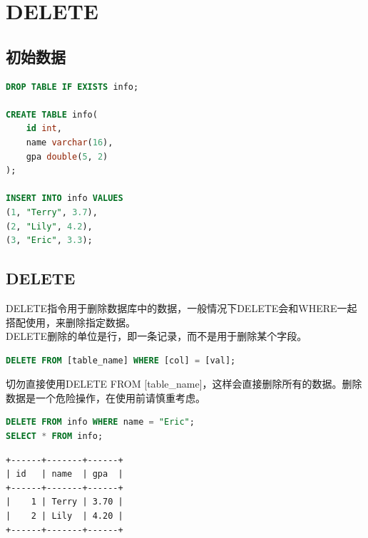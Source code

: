 \documentclass[12pt, openany, oneside]{book}
\begin{document}
\newpage

\chapter{DELETE}

\section{初始数据}


\begin{lstlisting}[language=SQL]
DROP TABLE IF EXISTS info;

CREATE TABLE info(
    id int,
    name varchar(16),
    gpa double(5, 2)
);

INSERT INTO info VALUES
(1, "Terry", 3.7),
(2, "Lily", 4.2),
(3, "Eric", 3.3);
\end{lstlisting}

\vspace{0.5cm}

\section{DELETE}

DELETE指令用于删除数据库中的数据，一般情况下DELETE会和WHERE一起搭配使用，来删除指定数据。\\

DELETE删除的单位是行，即一条记录，而不是用于删除某个字段。

\vspace{-0.5cm}

\begin{lstlisting}[language=SQL]
DELETE FROM [table_name] WHERE [col] = [val];
\end{lstlisting}

切勿直接使用DELETE FROM [table\_name]，这样会直接删除所有的数据。删除数据是一个危险操作，在使用前请慎重考虑。\\


\begin{lstlisting}[language=SQL]
DELETE FROM info WHERE name = "Eric";
SELECT * FROM info;
\end{lstlisting}

\begin{tcolorbox}
\begin{verbatim}
+------+-------+------+
| id   | name  | gpa  |
+------+-------+------+
|    1 | Terry | 3.70 |
|    2 | Lily  | 4.20 |
+------+-------+------+
\end{verbatim}
\end{tcolorbox}
\end{document}

